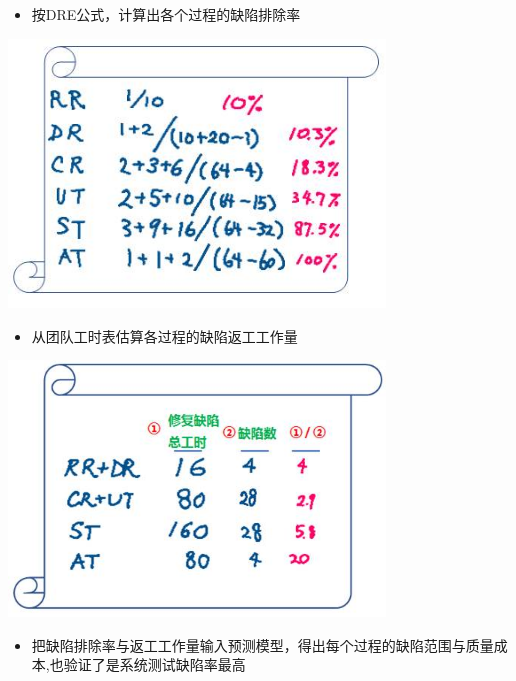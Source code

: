 \begin{itemize}
\tightlist
\item
  按DRE公式，计算出各个过程的缺陷排除率
\end{itemize}


\includegraphics[width=10cm]{2DreEstimateScreenshot_2021-12-01_2120491.jpg}

\begin{itemize}
\tightlist
\item
  从团队工时表估算各过程的缺陷返工工作量
\end{itemize}


\includegraphics[width=10cm]{4reworkByPhaseScreenshot_2021-12-01_2148381.jpg}

\begin{itemize}
\tightlist
\item
  把缺陷排除率与返工工作量输入预测模型，得出每个过程的缺陷范围与质量成本,也验证了是系统测试缺陷率最高
\end{itemize}

